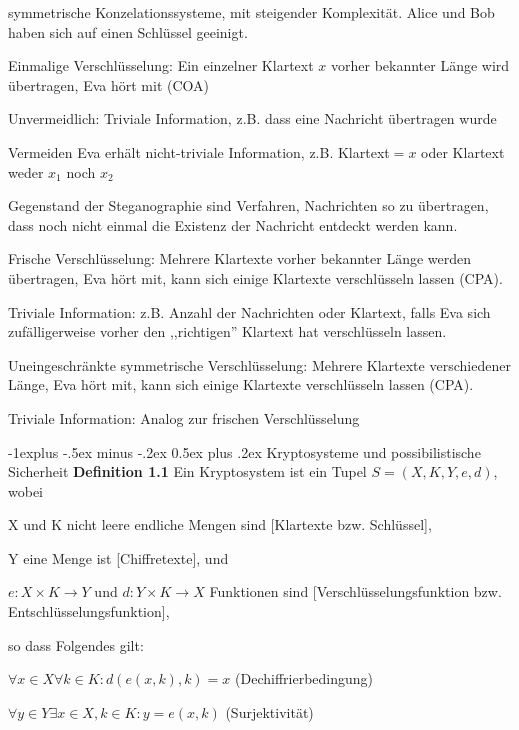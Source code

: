 \documentclass[a4paper]{article}
\makeatletter
\renewcommand{\subsection}{\@startsection{subsection}{2}{0mm}%
 {-1explus -.5ex minus -.2ex}%
 {0.5ex plus .2ex}%
 {\normalfont\normalsize\bfseries}}
\makeatother
\begin{document}
\begin{multicols}{3}
    symmetrische Konzelationssysteme, mit steigender Komplexität.
    Alice und Bob haben sich auf einen Schlüssel geeinigt.
    \begin{enumerate*}
        \item Einmalige Verschlüsselung: Ein einzelner Klartext $x$ vorher bekannter Länge wird übertragen, Eva hört mit (COA)
        \begin{itemize*}
            \item Unvermeidlich: Triviale Information, z.B. dass eine Nachricht übertragen wurde
            \item Vermeiden Eva erhält nicht-triviale Information, z.B. Klartext$=x$ oder Klartext weder $x_1$ noch $x_2$
            \item Gegenstand der Steganographie sind Verfahren, Nachrichten so zu übertragen, dass noch nicht einmal die Existenz der Nachricht entdeckt werden kann.
        \end{itemize*}
        \item Frische Verschlüsselung: Mehrere Klartexte vorher bekannter Länge werden übertragen, Eva hört mit, kann sich einige Klartexte verschlüsseln lassen (CPA).
        \begin{itemize*}
            \item Triviale Information: z.B. Anzahl der Nachrichten oder Klartext, falls Eva sich zufälligerweise vorher den ,,richtigen'' Klartext hat verschlüsseln lassen.
        \end{itemize*}
        \item Uneingeschränkte symmetrische Verschlüsselung: Mehrere Klartexte verschiedener Länge, Eva hört mit, kann sich einige Klartexte verschlüsseln lassen (CPA).
        \begin{itemize*}
            \item Triviale Information: Analog zur frischen Verschlüsselung
        \end{itemize*}
    \end{enumerate*}

    \subsection{Kryptosysteme und possibilistische Sicherheit}
    \textbf{Definition 1.1} Ein Kryptosystem ist ein Tupel $S=(X,K,Y,e,d)$, wobei
    \begin{itemize*}
        \item X und K nicht leere endliche Mengen sind [Klartexte bzw. Schlüssel],
        \item Y eine Menge ist [Chiffretexte], und
        \item $e:X\times K\rightarrow Y$ und $d:Y\times K\rightarrow X$ Funktionen sind [Verschlüsselungsfunktion bzw. Entschlüsselungsfunktion],
    \end{itemize*}
    so dass Folgendes gilt:
    \begin{enumerate*}
        \item $\forall x\in X\forall k\in K:d(e(x,k),k) =x$ (Dechiffrierbedingung)
        \item $\forall y\in Y\exists x\in X,k\in K:y=e(x,k)$ (Surjektivität)
    \end{enumerate*}


\end{multicols}
\end{document}
